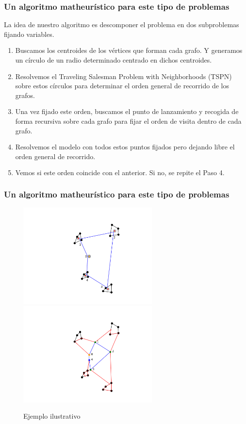 \documentclass[slidestop,usepdftitle=false, xcolor=table]{beamer}
\begin{document}
	\begin{frame}
		\frametitle{Un algoritmo matheurístico para este tipo de problemas}
		La idea de nuestro algoritmo es descomponer el problema en dos subproblemas fijando variables.
		\begin{footnotesize}
			\begin{enumerate}
				\item Buscamos los centroides de los vértices que forman cada grafo. Y generamos un círculo de un radio determinado centrado en dichos centroides.
				\item Resolvemos el Traveling Salesman Problem with Neighborhoods (TSPN) sobre estos círculos para determinar el orden general de recorrido de los grafos.
				\item Una vez fijado este orden, buscamos el punto de lanzamiento y recogida de forma recursiva sobre cada grafo para fijar el orden de visita dentro de cada grafo.
				\item Resolvemos el modelo con todos estos puntos fijados pero dejando libre el orden general de recorrido.
				\item Vemos si este orden coincide con el anterior. Si no, se repite el Paso 4.
			\end{enumerate}
		\end{footnotesize}
	\end{frame}

	\begin{frame}
		\frametitle{Un algoritmo matheurístico para este tipo de problemas}
			\begin{figure}%
				\hspace{-2.5cm}
		    \includegraphics[width=7cm]{step0}\hspace{-1.5cm}\includegraphics[width=7cm]{step1}%
		    \caption{Ejemplo ilustrativo}%
		    \label{fig:example}%
			\end{figure}
	\end{frame}
\end{document}
